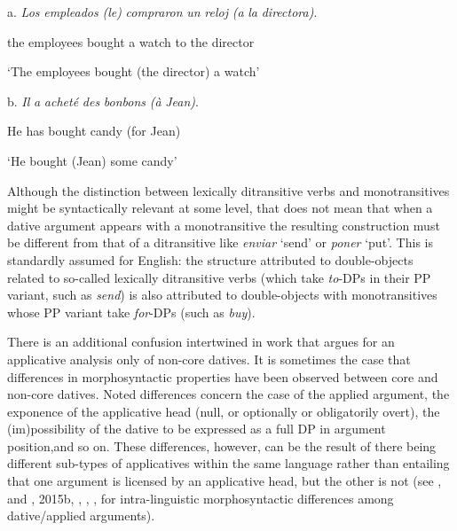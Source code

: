 \documentclass[output=paper,modfonts,nonflat]{langsci/langscibook}
\begin{document}
          a.  \textit{Los} \textit{empleados} \textit{(le)} \textit{compraron} \textit{un} \textit{reloj} \textit{(a} \textit{la} \textit{directora)}. 

       the employees bought a watch to the director 

       ‘The employees bought (the director) a watch’

  b.  \textit{Il} \textit{a} \textit{acheté} \textit{des} \textit{bonbons} \textit{(à} \textit{Jean)}.

       He has bought candy (for Jean)

       ‘He bought (Jean) some candy’

Although the distinction between lexically ditransitive verbs and monotransitives might be syntactically relevant at some level, that does not mean that when a dative argument appears with a monotransitive the resulting construction must be different from that of a ditransitive like \textit{enviar} ‘send’ or \textit{poner} ‘put’.  This is standardly assumed for English: the structure attributed to double-objects related to so-called lexically ditransitive verbs (which take \textit{to}{}-DPs in their PP variant, such as \textit{send}) is also attributed to double-objects with monotransitives whose PP variant take \textit{for}{}-DPs (such as \textit{buy}).

There is an additional confusion intertwined in work that argues for an applicative analysis only of non-core datives. It is sometimes the case that differences in morphosyntactic properties have been observed between core and non-core datives. Noted differences concern the case of the applied argument, the exponence of the applicative head (null, or optionally or obligatorily overt), the (im)possibility of the dative to be expressed as a full DP in argument position,and so on. These differences, however, can be the result of there being different sub-types of applicatives within the same language rather than entailing that one argument is licensed by an applicative head, but the other is not (see \citealt{BonehNash2012}, and \citealt{Cuervo2003}, 2015b, \citealt{Diaconescu2004}, \citealt{Pineda2016}, \citealt{RobergeTroberg2009}, for intra-linguistic morphosyntactic differences among dative/applied arguments). 
\end{document}
